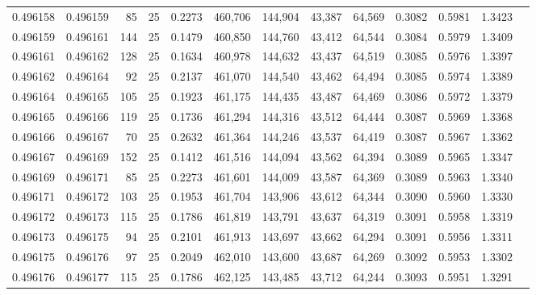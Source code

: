 \begin{tabular}{rrrrrrrrrrrrr}
0.496158 & 0.496159 &    85 &  25 &                                     0.2273 & 460,706 & 144,904 &  43,387 &  64,569 & 0.3082 & 0.5981 & 1.3423 \\
0.496159 & 0.496161 &   144 &  25 &                                     0.1479 & 460,850 & 144,760 &  43,412 &  64,544 & 0.3084 & 0.5979 & 1.3409 \\
0.496161 & 0.496162 &   128 &  25 &                                     0.1634 & 460,978 & 144,632 &  43,437 &  64,519 & 0.3085 & 0.5976 & 1.3397 \\
0.496162 & 0.496164 &    92 &  25 &                                     0.2137 & 461,070 & 144,540 &  43,462 &  64,494 & 0.3085 & 0.5974 & 1.3389 \\
0.496164 & 0.496165 &   105 &  25 &                                     0.1923 & 461,175 & 144,435 &  43,487 &  64,469 & 0.3086 & 0.5972 & 1.3379 \\
0.496165 & 0.496166 &   119 &  25 &                                     0.1736 & 461,294 & 144,316 &  43,512 &  64,444 & 0.3087 & 0.5969 & 1.3368 \\
0.496166 & 0.496167 &    70 &  25 &                                     0.2632 & 461,364 & 144,246 &  43,537 &  64,419 & 0.3087 & 0.5967 & 1.3362 \\
0.496167 & 0.496169 &   152 &  25 &                                     0.1412 & 461,516 & 144,094 &  43,562 &  64,394 & 0.3089 & 0.5965 & 1.3347 \\
0.496169 & 0.496171 &    85 &  25 &                                     0.2273 & 461,601 & 144,009 &  43,587 &  64,369 & 0.3089 & 0.5963 & 1.3340 \\
0.496171 & 0.496172 &   103 &  25 &                                     0.1953 & 461,704 & 143,906 &  43,612 &  64,344 & 0.3090 & 0.5960 & 1.3330 \\
0.496172 & 0.496173 &   115 &  25 &                                     0.1786 & 461,819 & 143,791 &  43,637 &  64,319 & 0.3091 & 0.5958 & 1.3319 \\
0.496173 & 0.496175 &    94 &  25 &                                     0.2101 & 461,913 & 143,697 &  43,662 &  64,294 & 0.3091 & 0.5956 & 1.3311 \\
0.496175 & 0.496176 &    97 &  25 &                                     0.2049 & 462,010 & 143,600 &  43,687 &  64,269 & 0.3092 & 0.5953 & 1.3302 \\
0.496176 & 0.496177 &   115 &  25 &                                     0.1786 & 462,125 & 143,485 &  43,712 &  64,244 & 0.3093 & 0.5951 & 1.3291 \\

\end{tabular}
